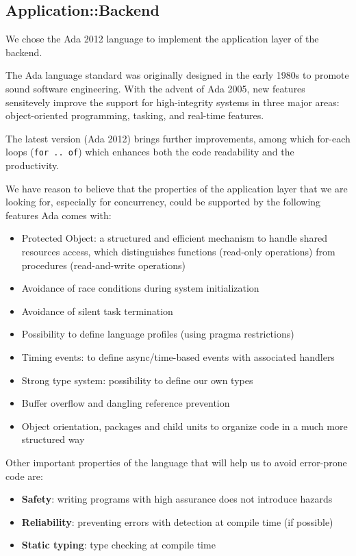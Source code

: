 \subsection{Application::Backend}
We chose the Ada 2012 language to implement the application layer of the
backend.

The Ada language standard was originally designed in the early 1980s to promote
sound software engineering. With the advent of Ada 2005, new features
sensitevely improve the support for high-integrity systems in three major
areas: object-oriented programming, tasking, and real-time features.

The latest version (Ada 2012) brings further improvements, among which for-each
loops (\texttt{for .. of}) which enhances both the code readability and the
productivity.

We have reason to believe that the properties of the application layer
that we are looking for, especially for concurrency, could be supported by the
following features Ada comes with:
\begin{itemize}
  \item Protected Object: a structured and efficient mechanism to handle
        shared resources access, which distinguishes functions (read-only
        operations) from procedures (read-and-write operations)
  \item Avoidance of race conditions during system initialization
  \item Avoidance of silent task termination
  \item Possibility to define language profiles (using pragma restrictions)
  \item Timing events: to define async/time-based events with associated
        handlers
  \item Strong type system: possibility to define our own types
  \item Buffer overflow and dangling reference prevention
  \item Object orientation, packages and child units to organize code in a much
        more structured way
\end{itemize}

Other important properties of the language that will help us to avoid
error-prone code are:
\begin{itemize}
  \item \textbf{Safety}: writing programs with high assurance does not
        introduce hazards
  \item \textbf{Reliability}: preventing errors with detection at compile time
        (if possible)
  \item \textbf{Static typing}: type checking at compile time
\end{itemize}

